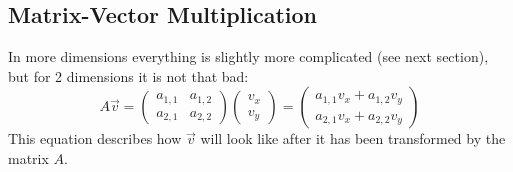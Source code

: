 \documentclass[a4paper]{report}
\begin{document}
\subsection{Matrix-Vector Multiplication}
In more dimensions everything is slightly more complicated (see next section), but for 2 dimensions it is not that bad:
\begin{equation}
A\vec{v} = \begin{pmatrix} a_{1,1} & a_{1,2} \\ a_{2,1} & a_{2,2} \end{pmatrix} \begin{pmatrix} v_x \\ v_y \end{pmatrix} = \begin{pmatrix} a_{1,1}v_x + a_{1,2} v_y \\ a_{2,1}v_x + a_{2,2}v_y \end{pmatrix}
\end{equation}
This equation describes how $\vec{v}$ will look like after it has been transformed by the matrix $A$.
\end{document}
